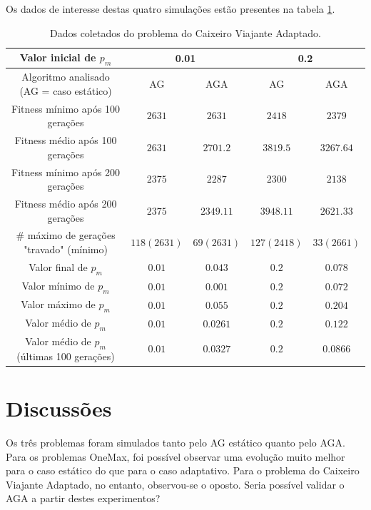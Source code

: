 Os dados de interesse destas quatro simulações estão presentes na tabela \ref{tab:tsp}.

\begin{table}
\caption{Dados coletados do problema do Caixeiro Viajante Adaptado.}
\label{tab:tsp}

\centering
\begin{tabular}[!hbt]{|c|cc|cc|}
	\hline
	Valor inicial de $p_m$						& \multicolumn{2}{c|}{0.01}		& \multicolumn{2}{c|}{0.2}		\\
	\hline
	Algoritmo analisado (AG = caso estático)	& AG			& AGA			& AG			& AGA			\\
	\hline
	Fitness mínimo após 100 gerações			& $2631$		& $2631$		& $2418$		& $2379$		\\
	Fitness médio após 100 gerações				& $2631$		& $2701.2$		& $3819.5$		& $3267.64$		\\
	Fitness mínimo após 200 gerações 			& $2375$		& $2287$		& $2300$		& $2138$		\\
	Fitness médio após 200 gerações 			& $2375$		& $2349.11$		& $3948.11$		& $2621.33$		\\
	\# máximo de gerações "travado" (mínimo)	& $118 (2631)$	& $69 (2631)$	& $127 (2418)$	& $33 (2661)$	\\
	Valor final de $p_m$						& $0.01$		& $0.043$		& $0.2$			& $0.078$		\\
	Valor mínimo de $p_m$						& $0.01$		& $0.001$		& $0.2$			& $0.072$		\\
	Valor máximo de $p_m$						& $0.01$		& $0.055$		& $0.2$			& $0.204$		\\
	Valor médio de $p_m$						& $0.01$		& $0.0261$		& $0.2$			& $0.122$		\\
	Valor médio de $p_m$ (últimas 100 gerações)	& $0.01$		& $0.0327$		& $0.2$			& $0.0866$		\\
	\hline
\end{tabular}
\end{table}

\section{Discussões}

Os três problemas foram simulados tanto pelo AG estático quanto pelo AGA. Para os problemas OneMax, foi possível observar uma evolução muito melhor para o caso estático do que para o caso adaptativo. Para o problema do Caixeiro Viajante Adaptado, no entanto, observou-se o oposto. Seria possível validar o AGA a partir destes experimentos?

